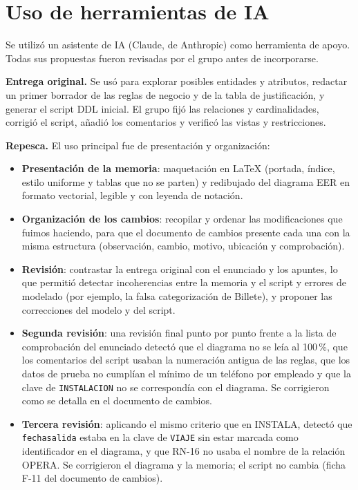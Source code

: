 \documentclass[11pt,a4paper]{article}
\DeclareRobustCommand{\_}{\textunderscore\allowbreak}
\newcommand{\tb}[1]{\texttt{#1}}
\begin{document}
\section{Uso de herramientas de IA}
Se utilizó un asistente de IA (Claude, de Anthropic) como herramienta de apoyo. Todas sus propuestas fueron revisadas por el grupo antes de incorporarse.

\textbf{Entrega original.} Se usó para explorar posibles entidades y atributos, redactar un primer borrador de las reglas de negocio y de la tabla de justificación, y generar el script DDL inicial. El grupo fijó las relaciones y cardinalidades, corrigió el script, añadió los comentarios y verificó las vistas y restricciones.

\textbf{Repesca.} El uso principal fue de presentación y organización:
\begin{itemize}
\item \textbf{Presentación de la memoria}: maquetación en LaTeX (portada, índice, estilo uniforme y tablas que no se parten) y redibujado del diagrama EER en formato vectorial, legible y con leyenda de notación.
\item \textbf{Organización de los cambios}: recopilar y ordenar las modificaciones que fuimos haciendo, para que el documento de cambios presente cada una con la misma estructura (observación, cambio, motivo, ubicación y comprobación).
\item \textbf{Revisión}: contrastar la entrega original con el enunciado y los apuntes, lo que permitió detectar incoherencias entre la memoria y el script y errores de modelado (por ejemplo, la falsa categorización de Billete), y proponer las correcciones del modelo y del script.
\item \textbf{Segunda revisión}: una revisión final punto por punto frente a la lista de comprobación del enunciado detectó que el diagrama no se leía al 100\,\%, que los comentarios del script usaban la numeración antigua de las reglas, que los datos de prueba no cumplían el mínimo de un teléfono por empleado y que la clave de \tb{INSTALACION} no se correspondía con el diagrama. Se corrigieron como se detalla en el documento de cambios.
\item \textbf{Tercera revisión}: aplicando el mismo criterio que en INSTALA, detectó que \tb{fecha\_salida} estaba en la clave de \tb{VIAJE} sin estar marcada como identificador en el diagrama, y que RN-16 no usaba el nombre de la relación OPERA. Se corrigieron el diagrama y la memoria; el script no cambia (ficha F-11 del documento de cambios).
\end{itemize}
\end{document}
